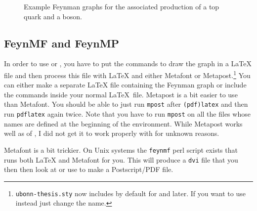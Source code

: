 \begin{figure}[htbp]
  \centering
  \quad
  \caption{Example Feynman graphs for the associated production
    of a top quark and a \PZ boson.}%
  \label{fig:tZq-pyfeyn}
\end{figure}


\subsection{FeynMF and FeynMP}%
\label{sec:fig:feynman:feynmf}

In order to use  or , you have to put
the commands to draw the graph in a \LaTeX{} file and then process
this file with \LaTeX{} and either Metafont or
Metapost.\footnote{\texttt{ubonn-thesis.sty} now includes 
  by default for  and later. If you want to use
   instead just change the name.} 
You can either make
a separate \LaTeX{} file containing the Feynman graph or include the
commands inside your normal \LaTeX\ file.  Metapost is
a bit easier to use than Metafont.  You should be able to just run
\texttt{mpost} after \texttt{(pdf)latex} and then run %
\texttt{pdflatex} again twice. Note that you have to run
\texttt{mpost} on all the files whose names are defined at the
beginning of the  environment. While Metapost works well
as of , I did not get it to work properly with  for unknown reasons.

Metafont is a bit trickier. On Unix systems the
\texttt{feynmf} perl script exists that runs both \LaTeX{} and
Metafont for you. This will produce a \texttt{dvi} file that you then
then look at or use to make a Postscript/PDF file.

